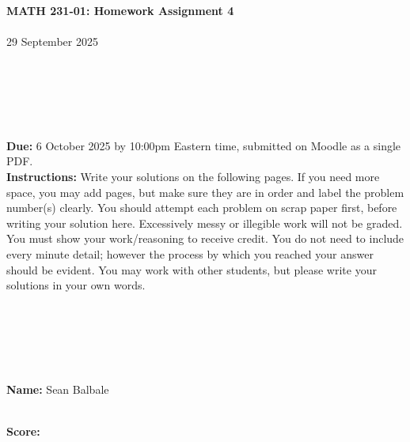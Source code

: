 \documentclass[reqno, 12pt]{amsart}
\begin{document}
\begin{center}
  {\bf MATH 231-01: Homework Assignment 4}\\~\\
  29 September 2025\\~\\~\\~\\~\\~\\
\end{center}

{\bf Due:} 6 October 2025 by 10:00pm Eastern time, submitted on Moodle as a single PDF.~\\


{\bf Instructions:} Write your solutions on the following pages. If you need more space, you may add pages, but make sure they are in order and label the problem number(s) clearly. You should attempt each problem on scrap paper first, before writing your solution here. Excessively messy or illegible work will not be graded. You must show your work/reasoning to receive credit. You do not need to include every minute detail; however the process by which you reached your answer should be evident. You may work with other students, but please write your solutions in your own words.

~\\~\\~\\~\\~\\
{\bf Name:} Sean Balbale

~\\
{\bf Score:}
\end{document}
